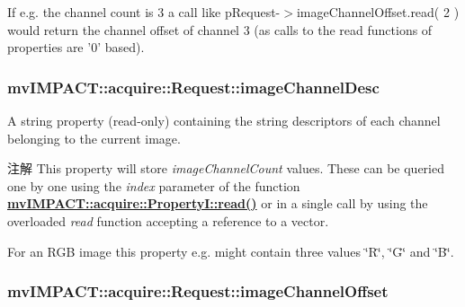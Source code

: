 If e.\+g. the channel count is 3 a call like p\+Request-\/$>$image\+Channel\+Offset.\+read( 2 ) would return the channel offset of channel 3 (as calls to the read functions of properties are '0' based). \hypertarget{classmv_i_m_p_a_c_t_1_1acquire_1_1_request_ac0e635d0a9be516925d40c5d1b77b1da}{
\subsubsection[{image\+Channel\+Desc}]{ mv\+I\+M\+P\+A\+C\+T\+::acquire\+::\+Request\+::image\+Channel\+Desc}}\label{classmv_i_m_p_a_c_t_1_1acquire_1_1_request_ac0e635d0a9be516925d40c5d1b77b1da}


A string property {\bfseries }(read-\/only) containing the string descriptors of each channel belonging to the current image. 

\begin{DoxyNote}{注解}
This property will store {\itshape image\+Channel\+Count} values. These can be queried one by one using the {\itshape index} parameter of the function {\bfseries \hyperlink{classmv_i_m_p_a_c_t_1_1acquire_1_1_enum_property_i_a6f88e97f646978391226aaf82cd5955d}{mv\+I\+M\+P\+A\+C\+T\+::acquire\+::\+Property\+I\+::read()}} or in a single call by using the overloaded {\itshape read} function accepting a reference to a vector.
\end{DoxyNote}
For an R\+G\+B image this property e.\+g. might contain three values \char`\"{}\+R\char`\"{}, \char`\"{}\+G\char`\"{} and \char`\"{}\+B\char`\"{}. \hypertarget{classmv_i_m_p_a_c_t_1_1acquire_1_1_request_a06a1b6f82fadab310b409434af963b36}{
\subsubsection[{image\+Channel\+Offset}]{ mv\+I\+M\+P\+A\+C\+T\+::acquire\+::\+Request\+::image\+Channel\+Offset}}\label{classmv_i_m_p_a_c_t_1_1acquire_1_1_request_a06a1b6f82fadab310b409434af963b36}


